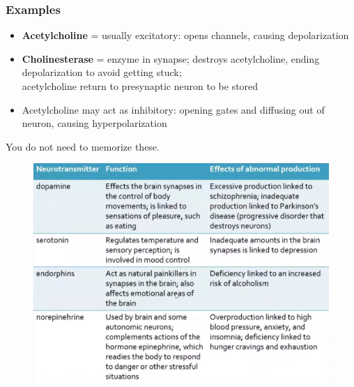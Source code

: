\documentclass[a4paper,12pt]{article}
\begin{document}
\subsubsection{Examples}
\begin{itemize}
    \item{\textbf{Acetylcholine} = usually excitatory: opens  channels, causing depolarization}
    \item{\textbf{Cholinesterase} = enzyme in synapse; destroys acetylcholine, ending depolarization to avoid getting stuck; \\ acetylcholine return to presynaptic neuron to be stored}
    \item{Acetylcholine may act as inhibitory: opening  gates and diffusing  out of neuron, causing hyperpolarization}
\end{itemize}

You do not need to memorize these.
\begin{figure}[H]
    \centering
    \includegraphics[width=\textwidth]{transex}
\end{figure}
\end{document}

